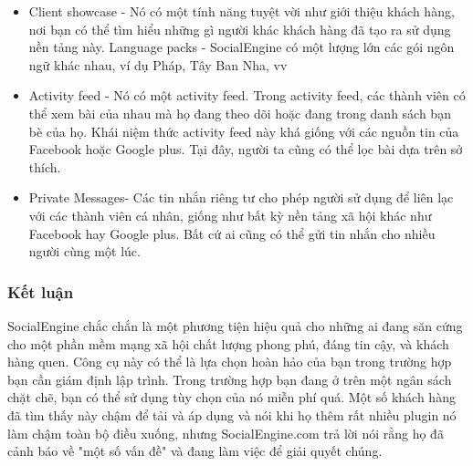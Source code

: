 \begin{itemize}
	\item Client showcase - Nó có một tính năng tuyệt vời như giới thiệu khách hàng, nơi bạn có thể tìm hiểu những gì người khác khách hàng đã tạo ra sử dụng nền tảng này.
	Language packs - SocialEngine có một lượng lớn các gói ngôn ngữ khác nhau, ví dụ Pháp, Tây Ban Nha, vv
	\item Activity feed - Nó có một activity feed. Trong activity feed, các thành viên có thể xem bài của nhau mà họ đang theo dõi hoặc đang trong danh sách bạn bè của họ. Khái niệm thức activity feed này khá giống với các nguồn tin của Facebook hoặc Google plus. Tại đây, người ta cũng có thể lọc bài dựa trên sở thích.
	\item Private Messages- Các tin nhắn riêng tư cho phép người sử dụng để liên lạc với các thành viên cá nhân, giống như bất kỳ nền tảng xã hội khác như Facebook hay Google plus. Bất cứ ai cũng có thể gửi tin nhắn cho nhiều người cùng một lúc.
\end{itemize}

\subsubsection{Kết luận}
SocialEngine chắc chắn là một phương tiện hiệu quả cho những ai đang săn cứng cho một phần mềm mạng xã hội chất lượng phong phú, đáng tin cậy, và khách hàng quen. Công cụ này có thể là lựa chọn hoàn hảo của bạn trong trường hợp bạn cần giám định lập trình. Trong trường hợp bạn đang ở trên một ngân sách chặt chẽ, bạn có thể sử dụng tùy chọn của nó miễn phí quá. Một số khách hàng đã tìm thấy này chậm để tải và áp dụng và nói khi họ thêm rất nhiều plugin nó làm chậm toàn bộ điều xuống, nhưng SocialEngine.com trả lời nói rằng họ đã cảnh báo về "một số vấn đề" và đang làm việc để giải quyết chúng.